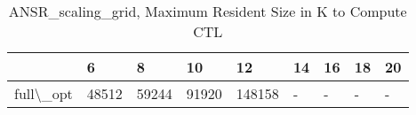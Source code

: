 \begin{table}
\centering
\caption{ANSR\_scaling\_grid, Maximum Resident Size in K to Compute CTL}
\label{ANSR_scaling_grid_CTL_size}
\begin{tabular}{lllllllll}
\toprule
{} &      6 &      8 &     10 &      12 & 14 & 16 & 18 & 20 \\
\midrule
full\textbackslash \_opt &  48512 &  59244 &  91920 &  148158 &  - &  - &  - &  - \\
\bottomrule
\end{tabular}
\end{table}
